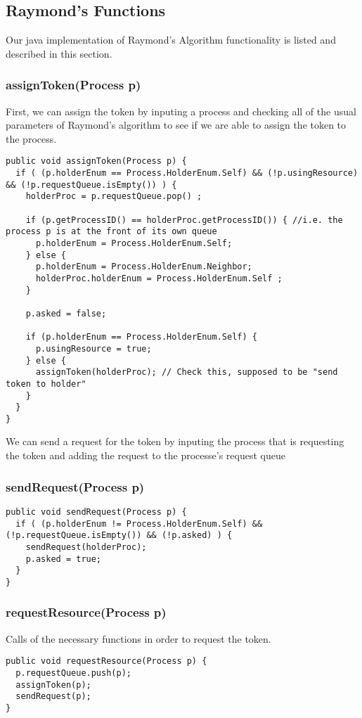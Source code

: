 \documentclass{article}
\begin{document}
	\subsection{Raymond's Functions}
	\label{subsec:RaymondsFunctions}
	Our java implementation of Raymond's Algorithm functionality is listed and described in this section.
	
		\subsubsection{assignToken(Process p)}
First, we can assign the token by inputing a process and checking all of the usual parameters of Raymond's algorithm to see if we are able to assign the token to the process.
		\begin{lstlisting}
public void assignToken(Process p) {
  if ( (p.holderEnum == Process.HolderEnum.Self) && (!p.usingResource) && (!p.requestQueue.isEmpty()) ) {
    holderProc = p.requestQueue.pop() ;

    if (p.getProcessID() == holderProc.getProcessID()) { //i.e. the process p is at the front of its own queue
      p.holderEnum = Process.HolderEnum.Self;
    } else {
      p.holderEnum = Process.HolderEnum.Neighbor;
      holderProc.holderEnum = Process.HolderEnum.Self ;
    }
	
    p.asked = false;
	
    if (p.holderEnum == Process.HolderEnum.Self) {
      p.usingResource = true;
    } else {
      assignToken(holderProc); // Check this, supposed to be "send token to holder"
    }
  }
}
		\end{lstlisting}
		We can send a request for the token by inputing the process that is requesting the token and adding the request to the processe's request queue
		\subsubsection{sendRequest(Process p)}
		\begin{lstlisting}
public void sendRequest(Process p) {
  if ( (p.holderEnum != Process.HolderEnum.Self) && (!p.requestQueue.isEmpty()) && (!p.asked) ) {
    sendRequest(holderProc);
    p.asked = true;
  }
}
		\end{lstlisting}
		\subsubsection{requestResource(Process p)}
		Calls of the necessary functions in order to request the token.
		\begin{lstlisting}
public void requestResource(Process p) {
  p.requestQueue.push(p);
  assignToken(p);
  sendRequest(p);
}
		\end{lstlisting}
		
\end{document}

